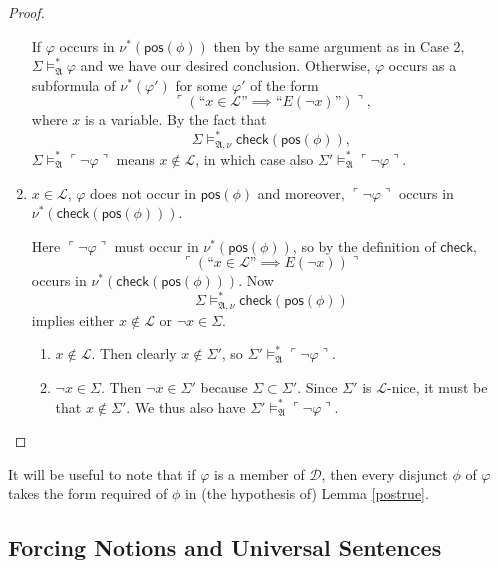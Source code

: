 \documentclass[12pt]{article}
\numberwithin{equation}{section}
\begin{document}
\begin{proof}
\begin{enumerate}[label=Case \arabic*:, leftmargin=50pt]
    If $\varphi$ occurs in $\nu^*(\mathsf{pos}(\phi))$ then by the same argument as in Case 2, $\Sigma \models^*_{\mathfrak{A}} \varphi$ and we have our desired conclusion. Otherwise, $\varphi$ occurs as a subformula of $\nu^*(\varphi')$ for some $\varphi'$ of the form $$\ulcorner (\text{``} x \in \mathcal{L} \text{''} \implies \text{``} E(\neg x) \text{''}) \urcorner \text{,}$$ where $x$ is a variable. By the fact that $$\Sigma \models^*_{\mathfrak{A}, \nu} \mathsf{check}(\mathsf{pos}(\phi)),$$ $\Sigma \models^*_{\mathfrak{A}} \ulcorner \neg \varphi \urcorner$ means $x \not \in \mathcal{L}$, in which case also $\Sigma' \models^*_{\mathfrak{A}} \ulcorner \neg \varphi \urcorner$.
    \item $x \in \mathcal{L}$, $\varphi$ does not occur in $\mathsf{pos}(\phi)$ and moreover, $\ulcorner \neg \varphi \urcorner$ occurs in \\ $\nu^*(\mathsf{check}(\mathsf{pos}(\phi)))$. 
    
    Here $\ulcorner \neg \varphi \urcorner$ must occur in $\nu^*(\mathsf{pos}(\phi))$, so by the definition of $\mathsf{check}$, $$\ulcorner (\text{``} x \in \mathcal{L} \text{''} \implies E(\neg x)) \urcorner$$ occurs in $\nu^*(\mathsf{check}(\mathsf{pos}(\phi)))$. Now $$\Sigma \models^*_{\mathfrak{A}, \nu} \mathsf{check}(\mathsf{pos}(\phi))$$ implies either $x \not \in \mathcal{L}$ or $\neg x \in \Sigma$. 
    \begin{enumerate}[label=Subcase \arabic*:, leftmargin=60pt]
        \item $x \not \in \mathcal{L}$. Then clearly $x \not \in \Sigma'$, so $\Sigma' \models^*_{\mathfrak{A}} \ulcorner \neg \varphi \urcorner$.
        \item $\neg x \in \Sigma$. Then $\neg x \in \Sigma'$ because $\Sigma \subset \Sigma'$. Since $\Sigma'$ is $\mathcal{L}$-nice, it must be that $x \not \in \Sigma'$. We thus also have $\Sigma' \models^*_{\mathfrak{A}} \ulcorner \neg \varphi \urcorner$. \qedhere
    \end{enumerate}
\end{enumerate}
\end{proof}

\begin{rem}\label{rem328}
It will be useful to note that if $\varphi$ is a member of $\mathcal{D}$, then every disjunct $\phi$ of $\varphi$ takes the form required of $\phi$ in (the hypothesis of) Lemma \ref{postrue}.
\end{rem}

\subsection{Forcing Notions and Universal Sentences}
\end{document}
